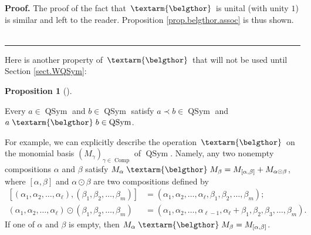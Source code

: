 \documentclass
[numbers=enddot,12pt,final,onecolumn,notitlepage,abstracton]{scrartcl}%
\theoremstyle{definition}
\newtheorem{prop}[theo]{Proposition}
\newenvironment{proposition}[1][]
{\begin{prop}[#1]\begin{leftbar}}
{\end{leftbar}\end{prop}}
\newenvironment{proof}[1][Proof]{\noindent\textbf{#1.} }{\ \rule{0.5em}{0.5em}}
\newenvironment{verlong}{}{}
\newenvironment{vershort}{}{}
\newcommand{\bel}{\left. \textarm{\belgthor} \right.}
\begin{document}
\begin{verlong}
\begin{proof}
The proof of the fact that $\bel $ is unital (with unity $1$) is similar and
left to the reader. Proposition \ref{prop.belgthor.assoc} is thus shown.
\end{proof}
\end{verlong}

Here is another property of $\bel $ that will not be used until Section
\ref{sect.WQSym}:

\begin{proposition}
\label{prop.QSym.closed}Every $a\in\operatorname*{QSym}$ and $b\in
\operatorname*{QSym}$ satisfy $a\left.  \prec\right.  b\in\operatorname*{QSym}%
$ and $a \bel b\in\operatorname*{QSym}$.
\end{proposition}

\begin{vershort}
For example, we can explicitly describe the operation $\bel $ on the monomial
basis $\left(  M_{\gamma}\right)  _{\gamma\in\operatorname*{Comp}}$ of
$\operatorname*{QSym}$. Namely, any two nonempty compositions $\alpha$ and
$\beta$ satisfy $M_{\alpha} \bel M_{\beta}=M_{\left[  \alpha,\beta\right]
}+M_{\alpha\odot\beta}$, where $\left[  \alpha,\beta\right]  $ and
$\alpha\odot\beta$ are two compositions defined by%
\begin{align*}
\left[  \left(  \alpha_{1},\alpha_{2},\ldots,\alpha_{\ell}\right)  ,\left(
\beta_{1},\beta_{2},\ldots,\beta_{m}\right)  \right]   &  =\left(  \alpha
_{1},\alpha_{2},\ldots,\alpha_{\ell},\beta_{1},\beta_{2},\ldots,\beta
_{m}\right)  ;\\
\left(  \alpha_{1},\alpha_{2},\ldots,\alpha_{\ell}\right)  \odot\left(
\beta_{1},\beta_{2},\ldots,\beta_{m}\right)   &  =\left(  \alpha_{1}%
,\alpha_{2},\ldots,\alpha_{\ell-1},\alpha_{\ell}+\beta_{1},\beta_{2},\beta
_{3},\ldots,\beta_{m}\right)  .
\end{align*}
If one of $\alpha$ and $\beta$ is empty, then $M_{\alpha} \bel M_{\beta
}=M_{\left[  \alpha,\beta\right]  }$.
\end{vershort}
\end{document}
